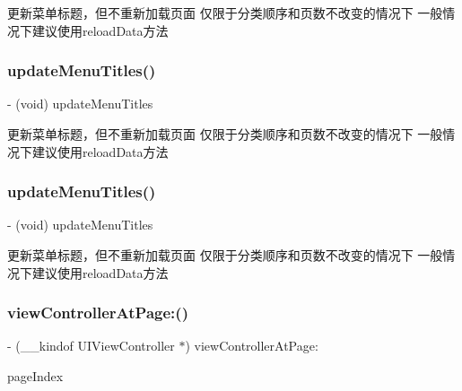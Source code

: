 更新菜单标题，但不重新加载页面 仅限于分类顺序和页数不改变的情况下 一般情况下建议使用reload\+Data方法 \mbox{\label{interface_v_t_magic_view_a87cfe336988bf4d06aa52c3e1bbef132}} 
\subsubsection{\texorpdfstring{update\+Menu\+Titles()}{updateMenuTitles()}\hspace{0.1cm}{\footnotesize\ttfamily [2/3]}}
{\footnotesize\ttfamily -\/ (void) update\+Menu\+Titles \begin{DoxyParamCaption}{ }\end{DoxyParamCaption}}

更新菜单标题，但不重新加载页面 仅限于分类顺序和页数不改变的情况下 一般情况下建议使用reload\+Data方法 \mbox{\label{interface_v_t_magic_view_a87cfe336988bf4d06aa52c3e1bbef132}} 
\subsubsection{\texorpdfstring{update\+Menu\+Titles()}{updateMenuTitles()}\hspace{0.1cm}{\footnotesize\ttfamily [3/3]}}
{\footnotesize\ttfamily -\/ (void) update\+Menu\+Titles \begin{DoxyParamCaption}{ }\end{DoxyParamCaption}}

更新菜单标题，但不重新加载页面 仅限于分类顺序和页数不改变的情况下 一般情况下建议使用reload\+Data方法 \mbox{\label{interface_v_t_magic_view_a16cb24e200dbf6952b217af4fd4e938e}} 
\subsubsection{\texorpdfstring{view\+Controller\+At\+Page\+:()}{viewControllerAtPage:()}\hspace{0.1cm}{\footnotesize\ttfamily [1/3]}}
{\footnotesize\ttfamily -\/ (\+\_\+\+\_\+kindof U\+I\+View\+Controller $\ast$) view\+Controller\+At\+Page\+: \begin{DoxyParamCaption}\item[{(N\+S\+U\+Integer)}]{page\+Index }\end{DoxyParamCaption}}

